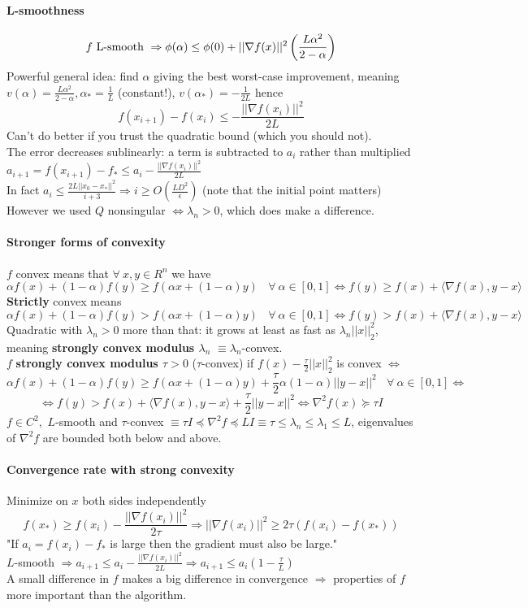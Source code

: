 \documentclass[10pt]{report}
\begin{document}
\paragraph{L-smoothness} $$f \hbox{ L-smooth }\Rightarrow \phi(\alpha) \leq \phi(0) + ||\nabla f(x)||^2\left(\frac{L\alpha^2}{2-\alpha}\right)$$
Powerful general idea: find $\alpha$ giving the best worst-case improvement, meaning $v(\alpha) = \frac{L\alpha^2}{2-\alpha}, \alpha_* = \frac{1}{L}$ (constant!), $v(\alpha_*) = -\frac{1}{2L}$ hence $$f(x_{i+1}) - f(x_i) \leq -\frac{||\nabla f(x_i)||^2}{2L}$$ Can't do better if you trust the quadratic bound (which you should not).\\
The error decreases sublinearly: a term is subtracted to $a_i$ rather than multiplied $a_{i+1} = f(x_{i+1}) - f_* \leq a_i - \frac{||\nabla f(x_i)||^2}{2L}$\\
In fact $a_i\leq \frac{2L||x_0 - x_*||^2}{i+3} \Rightarrow i\geq O(\frac{LD^2}{\epsilon})$ (note that the initial point matters)\\
However we used $Q$ nonsingular $\Leftrightarrow \lambda_n > 0$, which does make a difference.
\paragraph{Stronger forms of convexity}
$f$ convex means that $\forall\:x,y\in R^n$ we have $$\alpha f(x) + (1-\alpha)f(y)\geq f(\alpha x+ (1-\alpha)y)\:\:\:\:\forall\:\alpha\in[0,1] \Leftrightarrow f(y)\geq f(x) + \langle \nabla f(x), y-x\rangle$$
\textbf{Strictly} convex means $$\alpha f(x) + (1-\alpha)f(y)> f(\alpha x+ (1-\alpha)y)\:\:\:\:\forall\:\alpha\in[0,1] \Leftrightarrow f(y)> f(x) + \langle \nabla f(x), y-x\rangle$$
Quadratic with $\lambda_n > 0$ more than that: it grows at least as fast as $\lambda_n||x||_2^2$, meaning \textbf{strongly convex modulus $\lambda_n$} $\equiv \lambda_n$-convex.\\
$f$ \textbf{strongly convex modulus $\tau > 0$} ($\tau$-convex) if $f(x)-\frac{\tau}{2}||x||_2^2$ is convex $\Leftrightarrow$ $$\alpha f(x) + (1-\alpha)f(y)\geq f(\alpha x+ (1-\alpha)y)+\frac{\tau}{2}\alpha(1-\alpha)||y-x||^2\:\:\:\:\forall\:\alpha\in[0,1] \Leftrightarrow$$ $$\Leftrightarrow f(y)> f(x) + \langle \nabla f(x), y-x\rangle+\frac{\tau}{2}||y-x||^2 \Leftrightarrow\nabla^2 f(x) \succeq \tau I$$
$f \in C^2,$ $L$-smooth and $\tau$-convex $\equiv \tau I \preceq \nabla^2 f\preceq LI \equiv \tau \leq \lambda_n \leq \lambda_1 \leq L$, eigenvalues of $\nabla^2 f$ are bounded both below and above.
\paragraph{Convergence rate with strong convexity} Minimize on $x$ both sides independently $$f(x_*)\geq f(x_i) - \frac{||\nabla f(x_i)||^2}{2\tau} \Rightarrow ||\nabla f(x_i)||^2\geq 2\tau(f(x_i)-f(x_*))$$
"If $a_i = f(x_i) - f_*$ is large then the gradient must also be large."\\
$L$-smooth $\Rightarrow a_{i+1}\leq a_i - \frac{||\nabla f(x_i)||^2}{2L} \Rightarrow a_{i+1}\leq a_i(1-\frac{\tau}{L})$\\
A small difference in $f$ makes a big difference in convergence $\Rightarrow$ properties of $f$ more important than the algorithm.
\end{document}
